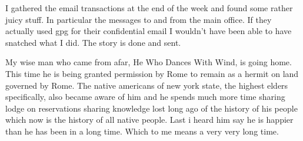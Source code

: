 I gathered the email transactions at the end of the week and found some rather juicy stuff. In particular the messages to and from the main office. If they actually used gpg for their confidential email I wouldn't have been able to have snatched what I did. The story is done and sent. 

My wise man who came from afar, He Who Dances With Wind, is going home. This time he is being granted permission by Rome to remain as a hermit on land governed by Rome. 
The native americans of new york state, the highest elders specifically, also became aware of him and he spends much more time sharing lodge on reservations sharing knowledge lost long ago of the history of his people which now is the history of all native people. Last i heard him say he is happier than he has been in a long time. Which to me means a very very long time.


